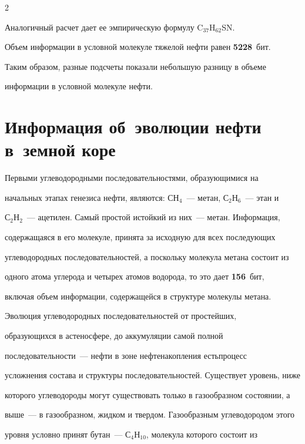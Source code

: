 \begin{multicols}{2}
     

     Аналогичный расчет дает ее эмпирическую формулу C$_{37}$H$_{62}$SN. 

Объем информации в условной молекуле тяжелой нефти равен \textbf{5228}~бит.

     

     Таким образом, разные подсчеты показали небольшую разницу в объеме 

информации в условной молекуле нефти.

     

\section{Информация об~эволюции нефти в~земной коре}



     Первыми углеводородными последователь\-ностями, образующимися на 

начальных этапах генезиса нефти, являются: СН$_4$~--- метан, С$_2$Н$_6$~--- этан и 

С$_2$Н$_2$~--- ацетилен. Самый простой и\linebreak стойкий из них~--- метан. Информация, 

содержащаяся в его молекуле, принята за исходную для всех последующих 

углеводородных последовательностей, а поскольку молекула метана состоит из 

одного атома углерода и четырех атомов водорода, то это дает \textbf{156}~бит, 

включая объем информации, содержащейся в структуре молекулы метана. 

     



     Эволюция углеводородных последовательностей от простейших, 

образующихся в астеносфере, до аккумуляции самой полной 

     по\-сле\-до\-ва\-тель\-ности~--- нефти в зоне нефтенакопления есть\linebreak процесс 

усложнения состава и структуры последовательностей. Существует уровень, ниже 

которого углеводороды могут существовать только в газообразном состоянии, а 

выше~--- в газообразном, жидком и твердом. Газообразным углеводородом этого 

уровня условно принят бутан~--- С$_4$Н$_{10}$, молекула которого состоит из 


\end{multicols}
